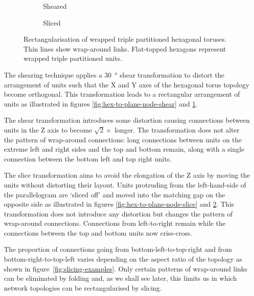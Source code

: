 \begin{figure}
\begin{subfigure}[b]{0.32\linewidth}
					\caption{Sheared}
					\label{fig:hex-to-plane-shear}
				\end{subfigure}
				\begin{subfigure}[b]{0.32\linewidth}
					\center
					
					\caption{Sliced}
					\label{fig:hex-to-plane-slice}
				\end{subfigure}
				
				\caption{Rectangularisation of wrapped triple partitioned hexagonal
				toruses. Thin lines show wrap-around links.  Flat-topped hexagons
				represent wrapped triple partitioned units.}
				\label{fig:hex-to-plane}
			\end{figure}
			
			The shearing technique applies a \SI{30}{\degree} shear transformation to
			distort the arrangement of units such that the X and Y axes of the
			hexagonal torus topology become orthogonal. This transformation leads to
			a rectangular arrangement of units as illustrated in figures
			\ref{fig:hex-to-plane-node-shear} and \ref{fig:hex-to-plane-shear}.
			
			The shear transformation introduces some distortion causing connections
			between units in the Z axis to become $\sqrt{2} \times$ longer. The
			transformation does not alter the pattern of wrap-around connections:
			long connections between units on the extreme left and right sides and
			the top and bottom remain, along with a single connection between the
			bottom left and top right units.
			
			The slice transformation aims to avoid the elongation of the Z axis by
			moving the units without distorting their layout. Units protruding from
			the left-hand-side of the parallelogram are `sliced off' and moved into
			the matching gap on the opposite side as illustrated in figures
			\ref{fig:hex-to-plane-node-slice} and \ref{fig:hex-to-plane-slice}. This
			transformation does not introduce any distortion but changes the pattern
			of wrap-around connections.  Connections from left-to-right remain while
			the connections between the top and bottom units now criss-cross.
			
			The proportion of connections going from bottom-left-to-top-right and
			from bottom-right-to-top-left varies depending on the aspect ratio of the
			topology as shown in figure~\ref{fig:slicing-examples}. Only certain
			patterns of wrap-around links can be eliminated by folding and, as we
			shall see later, this limits us in which network topologies can be
			rectangularised by slicing.
			
